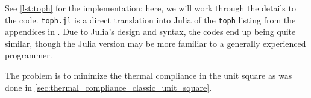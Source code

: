 See \autoref{lst:toph} for the implementation; here, we will work through the details to the code. \texttt{toph.jl}
is a direct translation
into Julia of the \texttt{toph} listing from the appendices in \cite{bendsoe_sigmund_topopt}. Due to Julia's
design and syntax, the codes end up being quite similar, though the Julia version may be more
familiar to a generally experienced programmer.

The problem is to minimize the thermal compliance in the unit square as was done in \autoref{sec:thermal_compliance_classic_unit_square}.